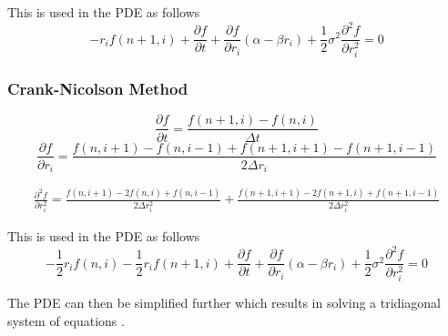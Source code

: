 \documentclass[12pt,a4paper]{article}
\begin{document}
This is used in the PDE as follows
$$-r_i f(n+1,i)  + \frac{\partial f}{\partial t} + \frac{\partial f}{\partial r_i}(\alpha - \beta r_i) +\frac{1}{2} \sigma^2 \frac{\partial^2 f}{\partial r_i^2}  = 0 $$
\subsubsection{Crank-Nicolson Method}
\label{subsubsec: Crank Method}

$$\frac{\partial f}{\partial t} = \frac{f(n+1,i) - f(n,i)}{\Delta t}$$
$$\frac{\partial f}{\partial r_i} = \frac{f(n,i+1) - f(n,i-1) +f(n+1,i+1) -f(n+1,i-1)}{2 \Delta r_i}$$

\begin{gather*}
\frac{\partial^2 f}{\partial r_i^2} = \frac{f(n,i+1) - 2f(n,i) + f(n,i-1)}{2\Delta r_i^2}
+ \frac{f(n+1,i+1) - 2f(n+1,i) +f(n+1,i-1)}{2\Delta r_i^2}
\end{gather*}

This is used in the PDE as follows
$$-\frac{1}{2}r_i f(n,i)-\frac{1}{2} r_i f(n+1,i) + \frac{\partial f}{\partial t} + \frac{\partial f}{\partial r_i}(\alpha - \beta r_i) +\frac{1}{2} \sigma^2 \frac{\partial^2 f}{\partial r_i^2}  = 0 $$

The PDE can then be simplified further which results in solving a tridiagonal system of equations \citep{Cairns}.
	
	
\end{document}
